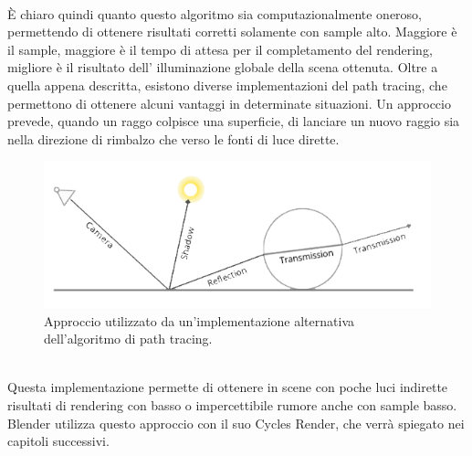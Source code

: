 \\
È chiaro quindi quanto questo algoritmo sia computazionalmente oneroso, permettendo di ottenere risultati corretti solamente con sample alto. Maggiore è il sample, maggiore è il tempo di attesa per il completamento del rendering, migliore è il risultato dell’ illuminazione globale della scena ottenuta. \cite{path3}
Oltre a quella appena descritta, esistono diverse implementazioni del path tracing, che permettono di ottenere alcuni vantaggi in determinate situazioni.
Un approccio prevede, quando un raggo colpisce una superficie, di lanciare un nuovo raggio sia nella direzione di rimbalzo che verso le fonti di luce dirette.
\\
\begin{figure}[htb]
 \centering
 \includegraphics[width=0.8\linewidth]{images/chapter_stato_arte/stato_arte_path_alt.png}\hfill
 \caption[Path Tracing: implementazioni alternative]{Approccio utilizzato da un'implementazione alternativa dell'algoritmo di path tracing.}
 \label{fig:stato_arte_path_alt}
\end{figure}
\\
Questa implementazione permette di ottenere in scene con poche luci indirette risultati di rendering con basso o impercettibile rumore anche con sample basso. 
Blender utilizza questo approccio con il suo Cycles Render, che verrà spiegato nei capitoli successivi.

